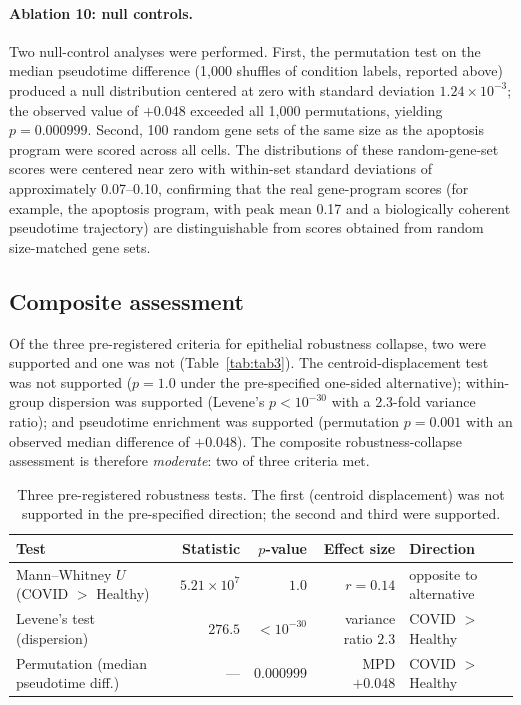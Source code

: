 \documentclass[11pt]{article}
\begin{document}
\paragraph{Ablation 10: null controls.} Two null-control analyses were performed. First, the permutation test on the median pseudotime difference (1{,}000 shuffles of condition labels, reported above) produced a null distribution centered at zero with standard deviation $1.24 \times 10^{-3}$; the observed value of $+0.048$ exceeded all 1{,}000 permutations, yielding $p = 0.000999$. Second, 100 random gene sets of the same size as the apoptosis program were scored across all cells. The distributions of these random-gene-set scores were centered near zero with within-set standard deviations of approximately 0.07--0.10, confirming that the real gene-program scores (for example, the apoptosis program, with peak mean 0.17 and a biologically coherent pseudotime trajectory) are distinguishable from scores obtained from random size-matched gene sets.

\subsection{Composite assessment}

Of the three pre-registered criteria for epithelial robustness collapse, two were supported and one was not (Table~\ref{tab:tab3}). The centroid-displacement test was not supported ($p = 1.0$ under the pre-specified one-sided alternative); within-group dispersion was supported (Levene's $p < 10^{-30}$ with a 2.3-fold variance ratio); and pseudotime enrichment was supported (permutation $p = 0.001$ with an observed median difference of $+0.048$). The composite robustness-collapse assessment is therefore \emph{moderate}: two of three criteria met.

\begin{table}[H]
\centering
\small
\begin{tabular}{lrrrl}
\toprule
Test & Statistic & $p$-value & Effect size & Direction \\
\midrule
Mann--Whitney $U$ (COVID $>$ Healthy) & $5.21 \times 10^{7}$ & $1.0$ & $r = 0.14$ & opposite to alternative \\
Levene's test (dispersion) & $276.5$ & $< 10^{-30}$ & variance ratio $2.3$ & COVID $>$ Healthy \\
Permutation (median pseudotime diff.) & --- & $0.000999$ & MPD $+0.048$ & COVID $>$ Healthy \\
\bottomrule
\end{tabular}
\caption{Three pre-registered robustness tests. The first (centroid displacement) was not supported in the pre-specified direction; the second and third were supported.}
\label{tab:tab2}
\end{table}
\end{document}
